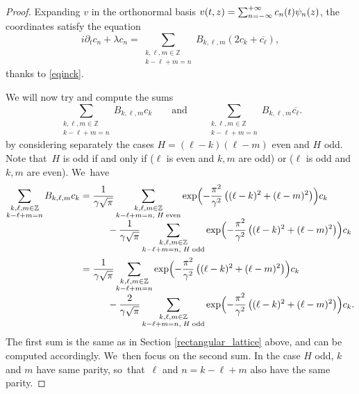 \documentclass[JEP,XML,SOM,Unicode,NoFloatCountersInSection,published]{cedram}
\theoremstyle{definition}
\let\EE\exp
\let\dis\relax
\let\ov\overline
\newcommand\Z{\mathbb Z}
\newcommand{\pa}[1]{\left(#1\right)}
\begin{document}
\begin{proof}
Expanding $v$ in the orthonormal basis $\dis v(t,z)=\sum_{n=-\infty}^{+\infty} c_n(t)\psi_n(z)$, the coordinates satisfy the equation
\begin{equation}\label{Lin_coeff_hexa}
i\partial_t c_n + \lambda c_n = \sum_{\substack {k, \ell, m \in \Z\\ k-\ell+m=n}}B_{k,\ell,m}(2c_{k} + \ov{c_{\ell}}),
\end{equation}
thanks to \eqref{eqinck}.

We will now try and compute the sums\vspace*{-3pt}
\[
\sum_{\substack {k, \ell, m\in \Z\\ k-\ell+m=n}}B_{k,\ell,m}c_{k} \qquad \text{and} \qquad \sum_{\substack {k, \ell, m \in \Z\\ k-\ell+m=n}}B_{k,\ell,m}\ov{c_{\ell}}.
\]
by considering separately the cases $H=(\ell-k)(\ell-m)$ even and $H$ odd. Note that~$H$ is odd if and only if ($\ell$ is even and $k,m$ are odd) or ($\ell$ is odd and $k,m$ are even). We~have\vspace*{-5pt}\enlargethispage{.5\baselineskip}
\begin{align*}
\sum_{\substack {k, \ell, m \in \Z\\ k-\ell+m=n}}B_{k,\ell,m}c_{k} &= \frac{1}{\gamma\sqrt{\pi}}\sum_{\substack {k, \ell, m \in \Z\\ k-\ell+m=n, \; H\; \text{even}}}\EE\Bigl({-\frac{\pi^2}{\gamma^2}\pa{(\ell-k)^2+(\ell-m)^2}}\Bigr)c_{k} \\[-5pt]
&\hspace{1cm}- \frac{1}{\gamma\sqrt{\pi}}\sum_{\substack {k, \ell, m \in \Z\\ k-\ell+m=n, \; H\; \text{odd}}}\EE\Bigl({-\frac{\pi^2}{\gamma^2}\pa{(\ell-k)^2+(\ell-m)^2}}\Bigr)c_{k} \\
&= \frac{1}{\gamma\sqrt{\pi}}\sum_{\substack {k, \ell, m \in \Z \\ k-\ell+m=n }}\EE\Bigl({-\frac{\pi^2}{\gamma^2}\pa{(\ell-k)^2+(\ell-m)^2}}\Bigr)c_{k} \\[-3pt]
&\hspace{1cm} - \frac{2}{\gamma\sqrt{\pi}}\sum_{\substack {k, \ell, m \in \Z\\ k-\ell+m=n, \; H\; \text{odd}}}\EE\Bigl({-\frac{\pi^2}{\gamma^2}\pa{(\ell-k)^2+(\ell-m)^2}}\Bigr)c_{k}.
\end{align*}
The first sum is the same as in Section \ref{rectangular_lattice} above, and can be computed accordingly. We~then focus on the second sum. In the case $H$ odd, $k$ and $m$ have same parity, so~that~$\ell$ and $n=k-\ell+m$ also have the same parity.


\end{proof}
\end{document}
